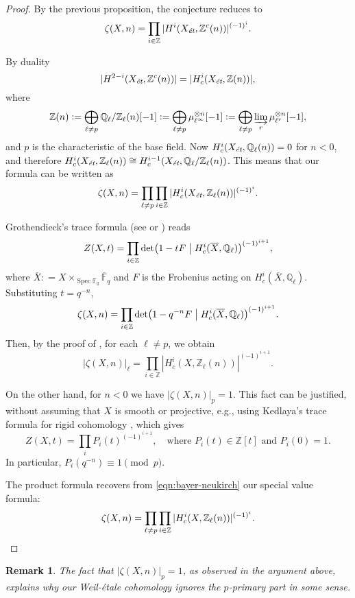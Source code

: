 \documentclass[10pt,a4paper,oneside,draft]{article}
\DeclareMathOperator{\Spec}{Spec}
\newcommand{\FF}{\mathbb{F}}
\newcommand{\QQ}{\mathbb{Q}}
\newcommand{\ZZ}{\mathbb{Z}}
\renewcommand{\det}{\operatorname{det}}
\newcommand{\et}{\text{\it \'{e}t}}
\newcommand{\dfn}{\mathrel{\mathop:}=}
\theoremstyle{myplain}
\theoremstyle{mydefinition}
\newtheorem{remark}[theorem]{Remark}
\numberwithin{equation}{section}
\begin{document}
\begin{proof}
  By the previous proposition, the conjecture reduces to
  $$\zeta (X,n) = \prod_{i \in \ZZ} |H^i (X_\et, \ZZ^c (n))|^{(-1)^i}.$$

  By duality \cite[Theorem~I]{Beshenov-Weil-etale-1}
  $$|H^{2-i} (X_\et, \ZZ^c (n))| = |H^i_c (X_\et, \ZZ (n))|,$$
  where
  \[ \ZZ (n) \dfn
    \bigoplus_{\ell \ne p} \QQ_\ell/\ZZ_\ell (n) [-1] \dfn
    \bigoplus_{\ell \ne p} \mu_{\ell^\infty}^{\otimes n} [-1] \dfn
    \bigoplus_{\ell \ne p} \varinjlim_r \mu_{\ell^r}^{\otimes n} [-1], \]
  and $p$ is the characteristic of the base field.
  Now $H^i_c (X_\et, \QQ_\ell (n)) = 0$ for $n < 0$, and therefore
  $H^i_c (X_\et, \ZZ_\ell (n)) \cong H^{i-1}_c (X_\et, \QQ_\ell/\ZZ_\ell (n))$.
  This means that our formula can be written as
  \[ \zeta (X,n) =
    \prod_{\ell \ne p} \prod_{i \in \ZZ} |H^i_c (X_\et, \ZZ_\ell (n))|^{(-1)^i}. \]

  Grothendieck's trace formula (see \cite{Grothendieck-FL} or
  \cite[Rapport]{SGA4-1-2}) reads
  \[ Z (X,t) =
    \prod_{i \in \ZZ} \det \bigl(1 - tF \bigm| H^i_c (\overline{X}, \QQ_\ell)\bigr)^{(-1)^{i+1}}, \]
  where $\overline{X} \dfn X \times_{\Spec \FF_q} \overline{\FF}_q$ and $F$ is
  the Frobenius acting on $H^i_c (\overline{X}, \QQ_\ell)$. Substituting
  $t = q^{-n}$,
  \[ \zeta (X,n) =
    \prod_{i \in \ZZ} \det \bigl(1 - q^{-n} F \bigm| H^i_c (\overline{X}, \QQ_\ell)\bigr)^{(-1)^{i+1}}. \]
  Then, by the proof of \cite[Theorem~(3.1)]{Bayer-Neukirch-1978}, for each
  $\ell \ne p$, we obtain
  \begin{equation}
    \label{eqn:bayer-neukirch}
    |\zeta (X,n)|_\ell =
    \prod_{i \in \ZZ} |H^i_c (X, \ZZ_\ell (n))|^{(-1)^{i+1}}.
  \end{equation}

  On the other hand, for $n < 0$ we have $|\zeta (X,n)|_p = 1$. This fact can
  be justified, without assuming that $X$ is smooth or projective, e.g., using
  Kedlaya's trace formula for rigid cohomology \cite[p.\,1446]{Kedlaya-2006},
  which gives
  \[ Z (X,t) = \prod_i P_i (t)^{(-1)^{i+1}},
    \quad\text{where }
    P_i (t) \in \ZZ[t] \text{ and } P_i (0) = 1. \]
  In particular, $P_i (q^{-n}) \equiv 1 \pmod{p}$.

  The product formula recovers from \eqref{eqn:bayer-neukirch} our special value
  formula:
  \[ \zeta (X,n) =
    \prod_{\ell \ne p} \prod_{i \in \ZZ} |H^i_c (X, \ZZ_\ell (n))|^{(-1)^i}. \qedhere \]
\end{proof}

\begin{remark}
  The fact that $|\zeta (X,n)|_p = 1$, as observed in the argument above,
  explains why our Weil-\'{e}tale cohomology ignores the $p$-primary part in
  some sense.
\end{remark}
\end{document}

